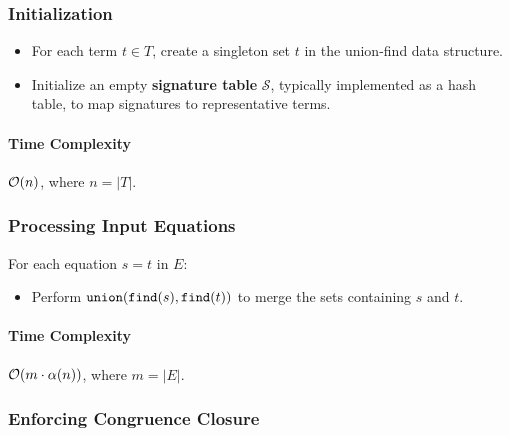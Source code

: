 \subsubsection*{Initialization}
\begin{itemize}
  \item For each term $t \in T$, create a singleton set
${ t }$ in the union-find data structure.
\item Initialize an empty \textbf{signature table} $\mathcal{S}$, typically implemented as a hash table,
to map signatures to representative terms.
\end{itemize}

\paragraph{Time Complexity} $\mathcal{O}(n)$, where $n = |T|$.

\subsubsection*{Processing Input Equations}

For each equation $s = t$ in $E$:
\begin{itemize}
\item
Perform $\mbox{\texttt{union}}(\mbox{\texttt{find}}(s), \mbox{\texttt{find}}(t))$ to merge the sets
containing $s$ and $t$.
\end{itemize}
\paragraph{Time Complexity} $\mathcal{O}(m \cdot \alpha(n))$, where $m = |E|$.

\subsubsection*{Enforcing Congruence Closure}

